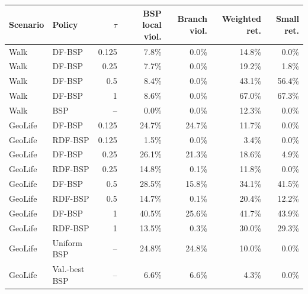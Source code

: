 \begin{tabular}{llrrrrr}
\toprule
Scenario & Policy & $\tau$ & BSP local viol. & Branch viol. & Weighted ret. & Small ret. \\
\midrule
Walk & DF-BSP & 0.125 & 7.8\% & 0.0\% & 14.8\% & 0.0\% \\
Walk & DF-BSP & 0.25 & 7.7\% & 0.0\% & 19.2\% & 1.8\% \\
Walk & DF-BSP & 0.5 & 8.4\% & 0.0\% & 43.1\% & 56.4\% \\
Walk & DF-BSP & 1 & 8.6\% & 0.0\% & 67.0\% & 67.3\% \\
Walk & BSP & -- & 0.0\% & 0.0\% & 12.3\% & 0.0\% \\
\addlinespace
GeoLife & DF-BSP & 0.125 & 24.7\% & 24.7\% & 11.7\% & 0.0\% \\
GeoLife & RDF-BSP & 0.125 & 1.5\% & 0.0\% & 3.4\% & 0.0\% \\
GeoLife & DF-BSP & 0.25 & 26.1\% & 21.3\% & 18.6\% & 4.9\% \\
GeoLife & RDF-BSP & 0.25 & 14.8\% & 0.1\% & 11.8\% & 0.0\% \\
GeoLife & DF-BSP & 0.5 & 28.5\% & 15.8\% & 34.1\% & 41.5\% \\
GeoLife & RDF-BSP & 0.5 & 14.7\% & 0.1\% & 20.4\% & 12.2\% \\
GeoLife & DF-BSP & 1 & 40.5\% & 25.6\% & 41.7\% & 43.9\% \\
GeoLife & RDF-BSP & 1 & 13.5\% & 0.3\% & 30.0\% & 29.3\% \\
GeoLife & Uniform BSP & -- & 24.8\% & 24.8\% & 10.0\% & 0.0\% \\
GeoLife & Val.-best BSP & -- & 6.6\% & 6.6\% & 4.3\% & 0.0\% \\
\bottomrule
\end{tabular}
